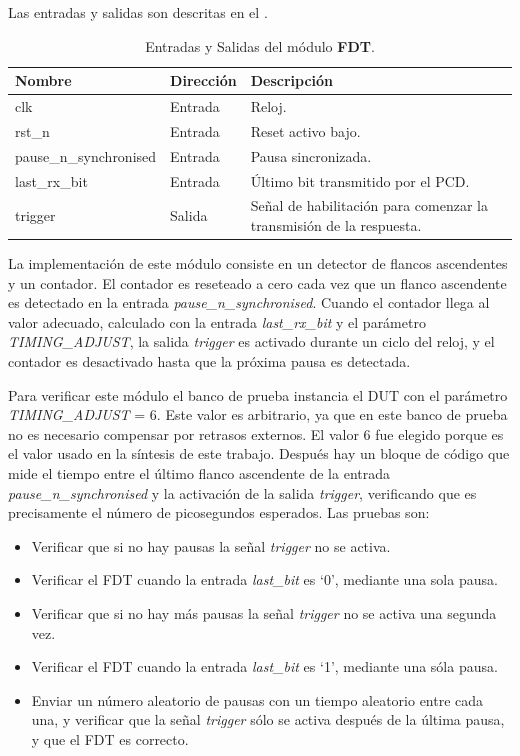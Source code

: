 \documentclass[a4paper, twoside, 11pt]{report}
\begin{document}
Las entradas y salidas son descritas en el .

\begin{table}[htb]
  \centering
  \tablezebra
  \begin{tabulary}{\linewidth}{l|l|L}
    \setcounter{rownum}{0}
    \textbf{Nombre}&\textbf{Dirección}&\textbf{Descripción} \\
    \hline
    clk&Entrada&Reloj. \\
    rst\_n&Entrada&Reset activo bajo. \\
    pause\_n\_synchronised&Entrada&Pausa sincronizada. \\
    last\_rx\_bit&Entrada&Último bit transmitido por el PCD. \\
    trigger&Salida&Señal de habilitación para comenzar la transmisión de la respuesta. \\
  \end{tabulary}
  \caption{Entradas y Salidas del módulo \textbf{FDT}.}
  \label{tab:ports_fdt}
\end{table}

La implementación de este módulo consiste en un detector de flancos ascendentes y un contador. El contador es reseteado a cero cada vez que un flanco ascendente es detectado en la entrada \textit{pause\_n\_synchronised}. Cuando el contador llega al valor adecuado, calculado con la entrada \textit{last\_rx\_bit} y el parámetro \textit{TIMING\_ADJUST}, la salida \textit{trigger} es activado durante un ciclo del reloj, y el contador es desactivado hasta que la próxima pausa es detectada.

Para verificar este módulo el banco de prueba instancia el DUT con el parámetro \textit{TIM\-ING\_ADJUST} = 6. Este valor es arbitrario, ya que en este banco de prueba no es necesario compensar por retrasos externos. El valor 6 fue elegido porque es el valor usado en la síntesis de este trabajo. Después hay un bloque de código que mide el tiempo entre el último flanco ascendente de la entrada \textit{pause\_n\_synchronised} y la activación de la salida \textit{trigger}, verificando que es precisamente el número de picosegundos esperados. Las pruebas son:

\begin{itemize}
  \item Verificar que si no hay pausas la señal \textit{trigger} no se activa.
  \item Verificar el FDT cuando la entrada \textit{last\_bit} es ‘0’, mediante una sola pausa.
  \item Verificar que si no hay más pausas la señal \textit{trigger} no se activa una segunda vez.
  \item Verificar el FDT cuando la entrada \textit{last\_bit} es ‘1’, mediante una sóla pausa.
  \item Enviar un número aleatorio de pausas con un tiempo aleatorio entre cada una, y verificar que la señal \textit{trigger} sólo se activa después de la última pausa, y que el FDT es correcto.
\end{itemize}
\end{document}
